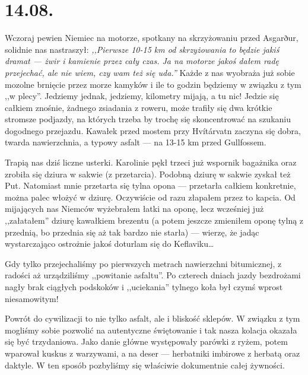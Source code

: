 \chapter*{14.08.}

Wczoraj pewien Niemiec na motorze, spotkany na skrzyżowaniu przed Asgarður, solidnie nas nastraszył: \emph{,,Pierwsze 10-15 km od skrzyżowania to będzie jakiś dramat --- żwir i kamienie przez cały czas. Ja na motorze jakoś dałem radę przejechać, ale nie wiem, czy wam też się uda.''} Każde z nas wyobraża już sobie mozolne brnięcie przez morze kamyków i ile to godzin będziemy w związku z tym ,,w plecy''. Jedziemy jednak, jedziemy, kilometry mijają, a tu nic! Jedzie się całkiem znośnie, żadnego zsiadania z roweru, może trafiły się dwa krótkie stromsze podjazdy, na których trzeba by trochę się skoncentrować na szukaniu dogodnego przejazdu. Kawałek przed mostem przy Hvítárvatn zaczyna się dobra, twarda nawierzchnia, a typowy asfalt --- na 13-15 km przed Gullfossem.


Trapią nas dziś liczne usterki. Karolinie pękł trzeci już wspornik bagażnika oraz zrobiła się dziura w sakwie (z przetarcia). Podobną dziurę w sakwie zyskał też Put. Natomiast mnie przetarta się tylna opona --- przetarła całkiem konkretnie, można palec włożyć w dziurę. Oczywiście od razu złapałem przez to kapcia. Od mijających nas Niemców wyżebrałem łatki na oponę, lecz wcześniej już ,,załatałem'' dziurę kawałkiem brezentu (a potem jeszcze zmieniłem oponę tylną z przednią, bo przednia się aż tak bardzo nie starła) --- wierzę, że jadąc wystarczająco ostrożnie jakoś doturlam się do Keflaviku…


Gdy tylko przejechaliśmy po pierwszych metrach nawierzchni bitumicznej, z radości aż urządziliśmy ,,powitanie asfaltu''. Po czterech dniach jazdy bezdrożami nagły brak ciągłych podskoków i ,,uciekania'' tylnego koła był czymś wprost niesamowitym!

Powrót do cywilizacji to nie tylko asfalt, ale i bliskość sklepów. W związku z tym mogliśmy sobie pozwolić na autentyczne świętowanie i tak nasza kolacja okazała się być trzydaniowa. Jako danie główne występowały parówki z ryżem, potem wparował kuskus z warzywami, a na deser --- herbatniki imbirowe z herbatą oraz daktyle. W ten sposób pozbyliśmy się właściwie dokumentnie całej żywności.

